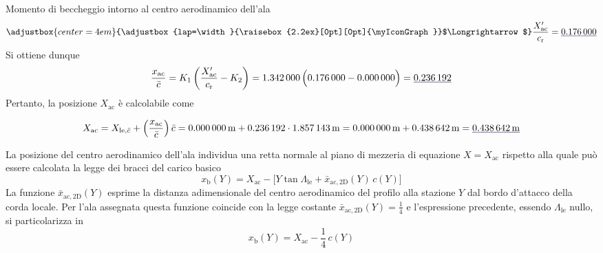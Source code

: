 \documentclass[[12pt,twoside]{book}
\begin{document}
\begin{myExampleX}{Momento di beccheggio intorno al centro aerodinamico dell'ala}{}
\[\adjustbox{center=4em}{%
  \adjustbox{lap=\width}{\raisebox{2.2ex}[0pt][0pt]{\myIconGraph}}$\Longrightarrow$%
}
%
\frac{X'_{\mathrm{ac}}}{c_\mathrm{r}}
  = \mathunderline{mydarkblue}{ \SI[round-precision=3]{\myXACOverChordRootDatcomWing}{} }
\]
%
Si ottiene dunque
\[
\frac{x_{\mathrm{ac}}}{\bar{c}} 
  = K_1 \left( \frac{X'_{\mathrm{ac}}}{c_\mathrm{r}} - K_2  \right)
  = \SI[round-precision=3]{\myKOneACDatcomWing}{} \,
    \Big(  
      \SI[round-precision=3]{\myXACOverChordRootDatcomWing}{} 
        - \SI[round-precision=3]{\myKTwoACDatcomWing}{}  
    \Big)
  = \mathunderline{mydarkblue}{ \SI[round-precision=3]{\myXsiACWing}{} } 
\]
%
Pertanto, la posizione $X_\mathrm{ac}$ è calcolabile come

\[
X_\mathrm{ac} 
  =
    X_{\mathrm{le},\bar{c}} + \left( \frac{x_{\mathrm{ac}}}{\bar{c}} \right) \bar{c}
=
    \SI[round-precision=2]{\myXMACLEToApexWingMT}{\metre}
      + \SI[round-precision=3]{\myXsiACWing}{}
        \cdot \SI[round-precision=2]{\myMACWingMT}{\metre}
      = \SI[round-precision=2]{\myXMACLEToApexWingMT}{\metre}
        + \SI[round-precision=2]{\myACWingToMACLEWingMT}{\metre} 
    = \mathunderline{mydarkblue}{ 
      \SI[round-precision=2]{\myACWingToApexWingMT}{\metre} 
    }%
\]

La posizione del centro aerodinamico dell'ala individua una retta normale al piano di mezzeria
di equazione $X=X_\mathrm{ac}$ rispetto alla quale può essere calcolata la legge dei bracci
del carico basico
\[
x_\mathrm{b}(Y) 
  = X_\mathrm{ac} 
    - \Big[ Y \tan \Lambda_\mathrm{le} + \bar{x}_{\mathrm{ac,2D}} (Y) \, c(Y) \Big]
\]
La funzione $\bar{x}_{\mathrm{ac,2D}}(Y)$ esprime la distanza adimensionale del centro 
aerodinamico del profilo alla stazione $Y$ dal bordo d'attacco della corda locale. 
Per l'ala assegnata questa funzione coincide con la legge costante
$\bar{x}_{\mathrm{ac,2D}}(Y) = \frac{1}{4}$ e l'espressione precedente,
essendo $\Lambda_\mathrm{le}$ nullo, si particolarizza in
\[
x_\mathrm{b}(Y) = X_\mathrm{ac} - \frac{1}{4} \, c(Y)
\]


\end{myExampleX}
\end{document}

